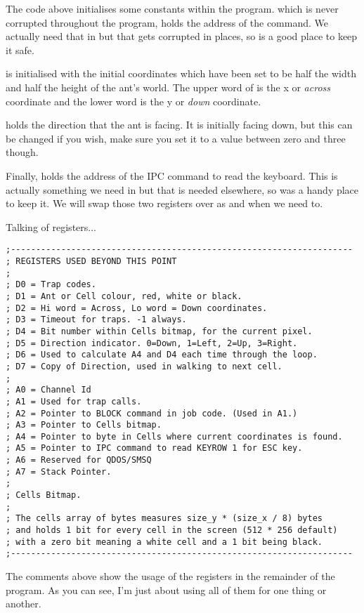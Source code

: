 The code above initialises some constants within the program.  which is never corrupted throughout the program, holds the address of the  command. We actually need that in  but that gets corrupted in places, so  is a good place to keep it safe.

 is initialised with the initial coordinates which have been set to be half the width and half the height of the ant's world. The upper word of  is the x or \emph{across} coordinate and the lower word is the y or \emph{down} coordinate. 

 holds the direction that the ant is facing. It is initially facing down, but this can be changed if you wish, make sure you set it to a value between zero and three though.

Finally,  holds the address of the IPC command to read the keyboard. This is actually something we need in  but that is needed elsewhere, so  was a handy place to keep it. We will swap those two registers over as and when we need to.

Talking of registers...

\begin{lstlisting}[firstnumber=last,caption={Langtons Ant - Register Usage}]
;--------------------------------------------------------------------
; REGISTERS USED BEYOND THIS POINT
;
; D0 = Trap codes.
; D1 = Ant or Cell colour, red, white or black.
; D2 = Hi word = Across, Lo word = Down coordinates.
; D3 = Timeout for traps. -1 always.
; D4 = Bit number within Cells bitmap, for the current pixel.
; D5 = Direction indicator. 0=Down, 1=Left, 2=Up, 3=Right.
; D6 = Used to calculate A4 and D4 each time through the loop.
; D7 = Copy of Direction, used in walking to next cell.
;
; A0 = Channel Id
; A1 = Used for trap calls.
; A2 = Pointer to BLOCK command in job code. (Used in A1.)
; A3 = Pointer to Cells bitmap.
; A4 = Pointer to byte in Cells where current coordinates is found.
; A5 = Pointer to IPC command to read KEYROW 1 for ESC key.
; A6 = Reserved for QDOS/SMSQ
; A7 = Stack Pointer.
;
; Cells Bitmap.
;
; The cells array of bytes measures size_y * (size_x / 8) bytes
; and holds 1 bit for every cell in the screen (512 * 256 default)
; with a zero bit meaning a white cell and a 1 bit being black.
;--------------------------------------------------------------------

\end{lstlisting}

The comments above show the usage of the registers in the remainder of the program. As you can see, I'm just about using all of them for one thing or another.

